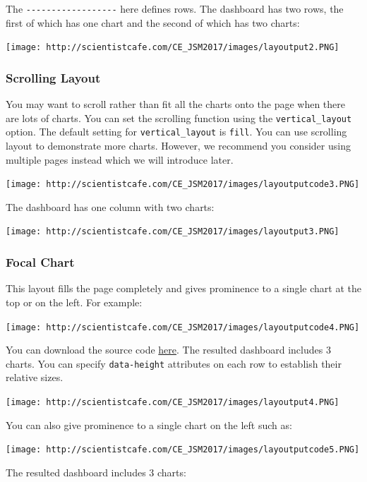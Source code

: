 \documentclass[]{book}
\theoremstyle{definition}
\theoremstyle{definition}
\theoremstyle{remark}
\begin{document}
 The \texttt{-\/-\/-\/-\/-\/-\/-\/-\/-\/-\/-\/-\/-\/-\/-\/-\/-\/-} here
defines rows. The dashboard has two rows, the first of which has one
chart and the second of which has two charts:

\texttt{[image: http://scientistcafe.com/CE\_JSM2017/images/layoutput2.PNG]}

\subsubsection{Scrolling Layout}\label{scrolling-layout}

You may want to scroll rather than fit all the charts onto the page when
there are lots of charts. You can set the scrolling function using the
\texttt{vertical\_layout} option. The default setting for
\texttt{vertical\_layout} is \texttt{fill}. You can use scrolling layout
to demonstrate more charts. However, we recommend you consider using
multiple pages instead which we will introduce later.

\texttt{[image: http://scientistcafe.com/CE\_JSM2017/images/layoutputcode3.PNG]}

 The dashboard has one column with two charts:

\texttt{[image: http://scientistcafe.com/CE\_JSM2017/images/layoutput3.PNG]}

\subsubsection{Focal Chart}\label{focal-chart}

This layout fills the page completely and gives prominence to a single
chart at the top or on the left. For example:

\texttt{[image: http://scientistcafe.com/CE\_JSM2017/images/layoutputcode4.PNG]}

 You can download the source code
\href{https://raw.githubusercontent.com/happyrabbit/linhui.org/gh-pages/CE_JSM2017/Examples/FocalChartTop.Rmd}{here}.
The resulted dashboard includes 3 charts. You can specify
\texttt{data-height} attributes on each row to establish their relative
sizes.

\texttt{[image: http://scientistcafe.com/CE\_JSM2017/images/layoutput4.PNG]}

You can also give prominence to a single chart on the left such as:

\texttt{[image: http://scientistcafe.com/CE\_JSM2017/images/layoutputcode5.PNG]}

 The resulted dashboard includes 3 charts:
\end{document}
